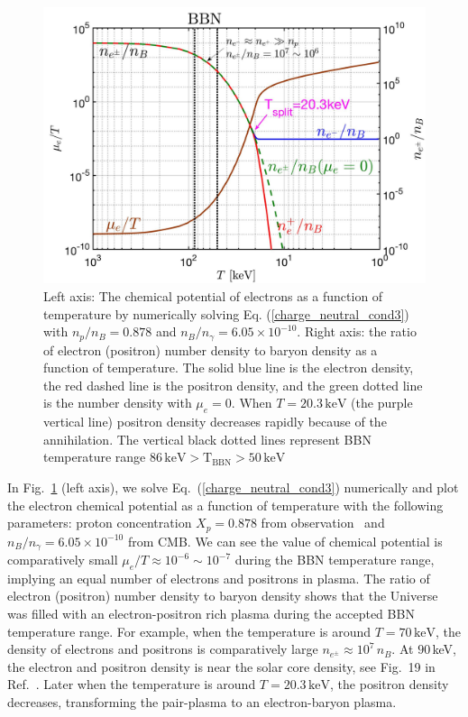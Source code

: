 \begin{figure}
\centerline{\includegraphics[width=0.90\linewidth]{plots/chap03BBN/May152023_EPDensity_Chemical}}
\caption{Left axis: The chemical potential of electrons as a function of temperature by numerically solving Eq. (\ref{charge_neutral_cond3}) with $n_p/n_B=0.878$ and $n_B/n_\gamma=6.05\times10^{-10}$. Right axis: the ratio of electron (positron) number density to baryon density as a function of temperature. The solid blue line is the electron density, the red dashed line is the positron density, and the green dotted line is the number density with $\mu_e=0$. When $T=20.3\,\mathrm{keV}$ (the purple vertical line) positron density decreases rapidly because of the annihilation. The vertical black dotted lines represent BBN temperature range $86\,\mathrm{keV}>\mathrm{T_{BBN}}>50\,\mathrm{keV}$}
\label{BBN:Electron}
\end{figure}

In Fig.~\ref{BBN:Electron} (left axis), we solve Eq.~(\ref{charge_neutral_cond3}) numerically and plot the electron chemical potential as a function of temperature with the following parameters: proton concentration $X_p=0.878$ from observation~\cite{ParticleDataGroup:2022pth} and $n_B/n_\gamma=6.05\times10^{-10}$ from CMB. We can see the value of chemical potential is comparatively small $\mu_e/T\approx10^{-6}\sim10^{-7}$ during the BBN temperature range, implying an equal number of electrons and positrons in plasma. The ratio of electron (positron) number density to baryon density shows that the Universe was filled with an electron-positron rich plasma during the accepted BBN temperature range. For example, when the temperature is around $T=70\,\mathrm{keV}$, the density of electrons and positrons is comparatively large $n_{e^\pm}\approx10^7\,n_B$. At $90$\,keV, the electron and positron density is near the solar core density, see Fig.~19 in Ref.~\cite{Rafelski:2023emw}. Later when the temperature is around $T=20.3\,\mathrm{keV}$, the positron density decreases, transforming the pair-plasma to an electron-baryon plasma.


